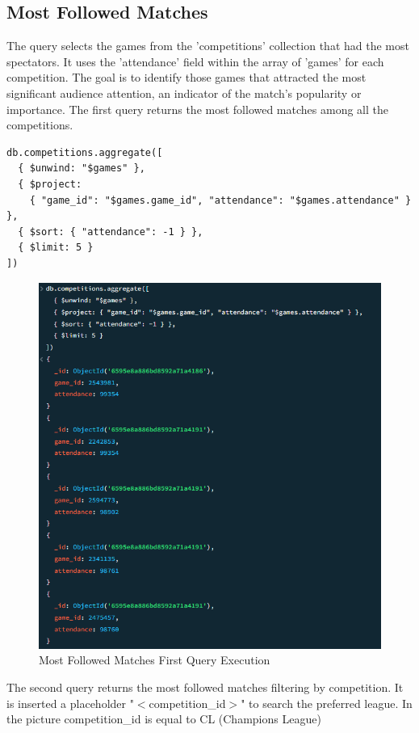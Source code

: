 \documentclass{Configuration_Files/PoliMi3i_thesis}
\begin{document}
\subsection{Most Followed Matches}
The query selects the games from the 'competitions' collection that had the most spectators. It uses the 'attendance' field within the array of 'games' for each competition. The goal is to identify those games that attracted the most significant audience attention, an indicator of the match's popularity or importance. 
The first query returns the most followed matches among all the competitions.
\begin{verbatim}
db.competitions.aggregate([
  { $unwind: "$games" },
  { $project: 
    { "game_id": "$games.game_id", "attendance": "$games.attendance" } },
  { $sort: { "attendance": -1 } },
  { $limit: 5 }
])
\end{verbatim}
\begin{figure}[htbp]
    \centering
    \includegraphics[scale=0.75]{Images/Queries/Competitions/most_followed_games/mfg.png}
    \caption{Most Followed Matches First Query Execution}
\end{figure}
The second query returns the most followed matches filtering by competition. It is inserted a placeholder "$<$competition\_id$>$" to search the preferred league. In the picture competition\_id is equal to CL (Champions League)
\end{document}
